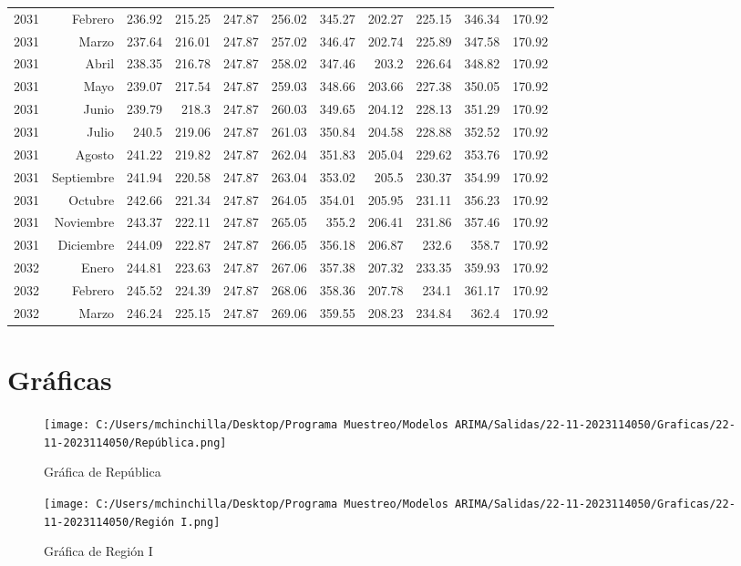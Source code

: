 \documentclass{article}%
\begin{document}
\begin{longtable}{|l r|r|r|r|r|r|r|r|r|r|}
2031&Febrero&236.92&215.25&247.87&256.02&345.27&202.27&225.15&346.34&170.92\\%
2031&Marzo&237.64&216.01&247.87&257.02&346.47&202.74&225.89&347.58&170.92\\%
2031&Abril&238.35&216.78&247.87&258.02&347.46&203.2&226.64&348.82&170.92\\%
2031&Mayo&239.07&217.54&247.87&259.03&348.66&203.66&227.38&350.05&170.92\\%
2031&Junio&239.79&218.3&247.87&260.03&349.65&204.12&228.13&351.29&170.92\\%
2031&Julio&240.5&219.06&247.87&261.03&350.84&204.58&228.88&352.52&170.92\\%
2031&Agosto&241.22&219.82&247.87&262.04&351.83&205.04&229.62&353.76&170.92\\%
2031&Septiembre&241.94&220.58&247.87&263.04&353.02&205.5&230.37&354.99&170.92\\%
2031&Octubre&242.66&221.34&247.87&264.05&354.01&205.95&231.11&356.23&170.92\\%
2031&Noviembre&243.37&222.11&247.87&265.05&355.2&206.41&231.86&357.46&170.92\\%
2031&Diciembre&244.09&222.87&247.87&266.05&356.18&206.87&232.6&358.7&170.92\\%
2032&Enero&244.81&223.63&247.87&267.06&357.38&207.32&233.35&359.93&170.92\\%
2032&Febrero&245.52&224.39&247.87&268.06&358.36&207.78&234.1&361.17&170.92\\%
2032&Marzo&246.24&225.15&247.87&269.06&359.55&208.23&234.84&362.4&170.92\\%
\hline%
\end{longtable}

%
\section{Gráficas}%
\label{sec:Grficas}%


\begin{figure}[H]%
\centering%
\texttt{[image: C:/Users/mchinchilla/Desktop/Programa Muestreo/Modelos ARIMA/Salidas/22-11-2023114050/Graficas/22-11-2023114050/República.png]}%
\caption{Gráfica de República}%
\end{figure}

%


\begin{figure}[H]%
\centering%
\texttt{[image: C:/Users/mchinchilla/Desktop/Programa Muestreo/Modelos ARIMA/Salidas/22-11-2023114050/Graficas/22-11-2023114050/Región I.png]}%
\caption{Gráfica de Región I}%
\end{figure}
\end{document}
